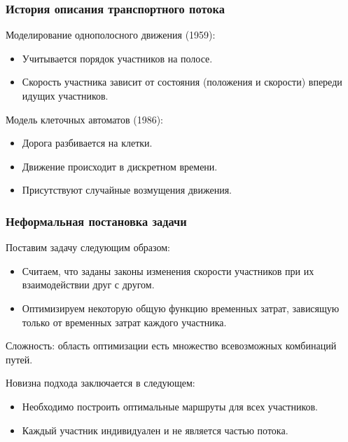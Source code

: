 \documentclass{beamer}
\begin{document}
\begin{frame}\frametitle{История описания транспортного потока}
	Моделирование однополосного движения (1959):
	\begin{itemize}
		\item Учитывается порядок участников на полосе.
		
		\item Скорость участника зависит от состояния (положения и скорости) впереди идущих участников.
	\end{itemize}

	\bigskip
	
	Модель клеточных автоматов (1986):
	\begin{itemize}
		\item Дорога разбивается на клетки.
		
		\item Движение происходит в дискретном времени.
		
		\item Присутствуют случайные возмущения движения.
	\end{itemize}
\end{frame}

\begin{frame}\frametitle{Неформальная постановка задачи}
	
	Поставим задачу следующим образом:
	
	\begin{itemize}
		\item Считаем, что заданы законы изменения скорости участников при их взаимодействии друг с другом.
		
		\item Оптимизируем некоторую общую функцию временных затрат, зависящую только от временных затрат каждого участника.
	\end{itemize}
	\bigskip
	Сложность: область оптимизации есть множество всевозможных комбинаций путей.
	
	\bigskip
	
	Новизна подхода заключается в следующем:
	\begin{itemize}
		\item Необходимо построить оптимальные маршруты для всех участников.
		
		\item Каждый участник индивидуален и не является частью потока.
	\end{itemize}

	\bigskip


\end{frame}
\end{document}
